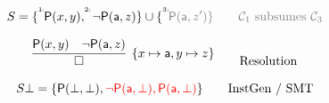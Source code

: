 



\begin{example}
	\begin{gather*}
	S = \{ \TI{1}\mP(x,y), \TI{2}\lnot \mP(\ma,z)\} \cup \{\TI{3}\colG\mP(\ma,z') \}
	\tag*{\( \mcC_1 \) subsumes \( \mcC_3 \)}
	\\[0.7em]
	\infer[\{x\mapsto\ma,y\mapsto z\}]
	{\square}
	{\mP(x,y) & \lnot \mP(\ma,z)}
	\tag*{Resolution}
	\\[0.7em]
	S\bot = \{ \mP(\bot,\bot), {\colLo\lnot \mP(\ma,\bot), \mP(\ma,\bot)} \}
	\tag*{InstGen / SMT}
	\end{gather*}
\end{example}

